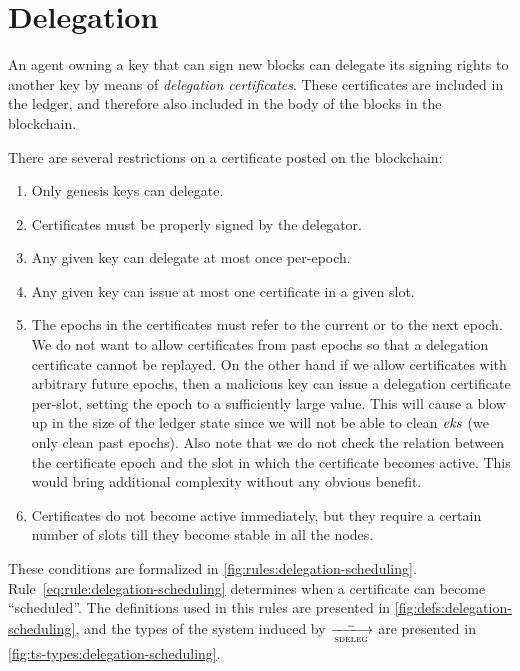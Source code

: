\section{Delegation}
\label{sec:delegation}

An agent owning a key that can sign new blocks can delegate its signing rights
to another key by means of \textit{delegation certificates}. These certificates
are included in the ledger, and therefore also included in the body of the
blocks in the blockchain.

There are several restrictions on a certificate posted on the blockchain:
\begin{enumerate}
\item Only genesis keys can delegate.
\item Certificates must be properly signed by the delegator.
\item Any given key can delegate at most once per-epoch.
\item Any given key can issue at most one certificate in a given slot.
\item The epochs in the certificates must refer to the current or to the next
  epoch. We do not want to allow certificates from past epochs so that a
  delegation certificate cannot be replayed. On the other hand if we allow
  certificates with arbitrary future epochs, then a malicious key can issue a
  delegation certificate per-slot, setting the epoch to a sufficiently large
  value. This will cause a blow up in the size of the ledger state since we
  will not be able to clean $\mathit{eks}$ (we only clean past epochs). Also note
  that we do not check the relation between the certificate epoch and the slot
  in which the certificate becomes active. This would bring additional
  complexity without any obvious benefit.
\item Certificates do not become active immediately, but they require a certain
  number of slots till they become stable in all the nodes.
\end{enumerate}
These conditions are formalized in \cref{fig:rules:delegation-scheduling}.
Rule~\ref{eq:rule:delegation-scheduling} determines when a certificate can
become ``scheduled''. The definitions used in this rules are presented in
\cref{fig:defs:delegation-scheduling}, and the types of the system induced by
$\trans{sdeleg}{\wcard}$ are presented in
\cref{fig:ts-types:delegation-scheduling}.

